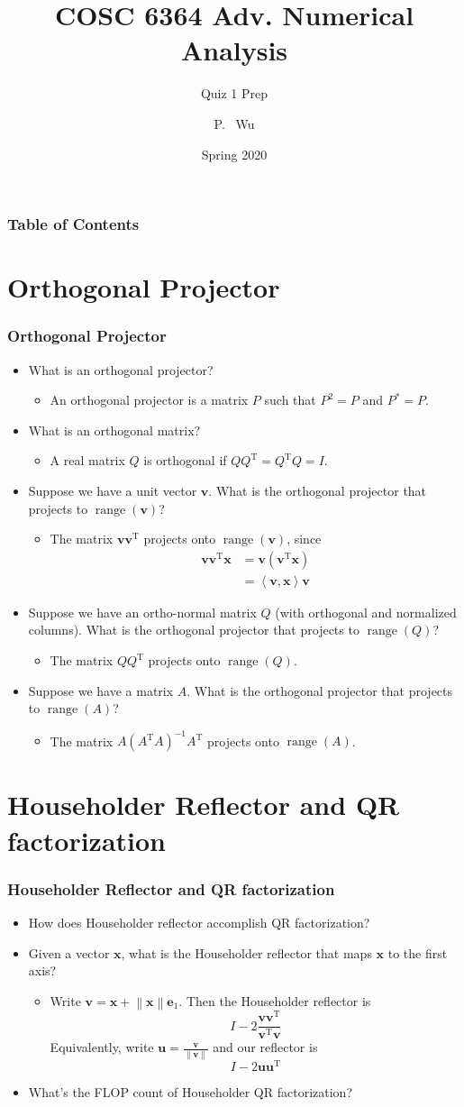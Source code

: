 \documentclass[10pt]{beamer}
\title[COSC6364 Adv. Numerical Analysis] %
{COSC 6364 Adv. Numerical Analysis}
\subtitle{Quiz 1 Prep}
\author[Wu, Panruo] %
{P. ~Wu\inst{1}}
\institute[VFU] %
{
  \inst{1}%
  Computer Science\\
  University of Houston
}
\date[Spring 2020] %
{Spring 2020}
\newcommand{\norm}[1]{\left\lVert#1\right\rVert}
\renewcommand{\vec}[1]{\boldsymbol{#1}}
\newcommand{\dotprod}[2]{\left\langle#1,#2\right\rangle}
\newcommand{\T}{\mathrm{T}}
\newcommand{\range}[1]{\operatorname{range}\left(#1\right)}
\newcommand{\subitem}[1]{\begin{itemize}\item #1\end{itemize}}
\begin{document}
\frame{\titlepage}

\begin{frame}
  \frametitle{Table of Contents}
  \tableofcontents
\end{frame}

\section{Orthogonal Projector}
\begin{frame}
  \frametitle{Orthogonal Projector}
  \begin{itemize}[<+->]
    \item What is an orthogonal projector?
    \subitem{An orthogonal projector is a matrix \(P\) such that \(P^2 = P\) and \(P^*=P\).}
    \item What is an orthogonal matrix?
    \subitem{A real matrix \(Q\) is orthogonal if \(QQ^{\T} = Q^{\T}Q=I\).}
    \item Suppose we have a unit vector \(\vec{v}\). What is the orthogonal projector that projects to \(\range{\vec{v}}\)?
    \subitem{The matrix \(\vec{v}\vec{v}^{\T}\) projects onto \(\range{\vec{v}}\), since \begin{align*}\vec{v}\vec{v}^{\T}\vec{x}&=\vec{v}\left(\vec{v}^{\T}\vec{x}\right)\\&=\dotprod{\vec{v}}{\vec{x}}\vec{v}\end{align*}\vspace{-5mm}}
    \item Suppose we have an ortho-normal matrix \(Q\) (with orthogonal and normalized columns). What is the orthogonal projector that projects to \(\range{Q}\)?
    \subitem{The matrix \(QQ^{\T}\) projects onto \(\range{Q}\).}
    \item Suppose we have a matrix \(A\). What is the orthogonal projector that projects to \(\range{A}\)?
    \subitem{The matrix \(A(A^{\T}A)^{-1}A^{\T}\) projects onto \(\range{A}\).}
  \end{itemize}
\end{frame}

\section{Householder Reflector and QR factorization}
\begin{frame}
  \frametitle{Householder Reflector and QR factorization}
  \begin{itemize}[<+->]
    \item How does Householder reflector accomplish QR factorization?
    \item Given a vector \(\vec{x}\), what is the Householder reflector that maps \(\vec{x}\) to the first axis?
    \subitem{Write \(\vec{v} = \vec{x} + \norm{\vec{x}}\vec{e}_1\). Then the Householder reflector is \[I - 2\frac{\vec{v}\vec{v}^{\T}}{\vec{v}^{\T}\vec{v}}\] Equivalently, write \(\vec{u}=\frac{\vec{v}}{\norm{\vec{v}}}\) and our reflector is \[I - 2\vec{u}\vec{u}^{\T}\]\vspace{-5mm}}
    \item What’s the FLOP count of Householder QR factorization?
  \end{itemize}
\end{frame}
\end{document}
